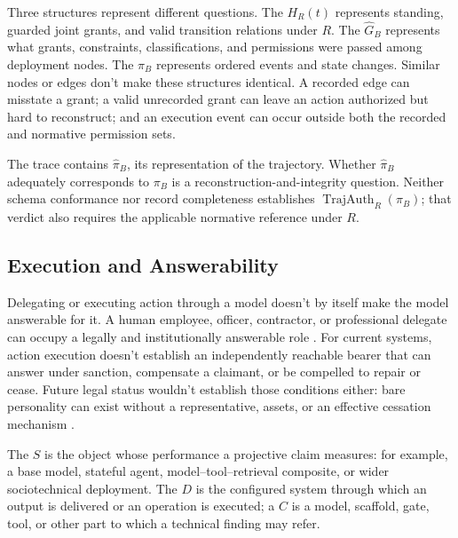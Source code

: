 Three structures represent different questions. The  \(H_R(t)\) represents standing, guarded joint grants, and valid transition relations under \(R\). The  \(\widehat G_B\) represents what grants, constraints, classifications, and permissions were passed among deployment nodes. The  \(\pi_B\) represents ordered events and state changes. Similar nodes or edges don't make these structures identical. A recorded edge can misstate a grant; a valid unrecorded grant can leave an action authorized but hard to reconstruct; and an execution event can occur outside both the recorded and normative permission sets.

The trace contains \(\widehat{\pi}_B\), its representation of the trajectory. Whether \(\widehat{\pi}_B\) adequately corresponds to \(\pi_B\) is a reconstruction-and-integrity question. Neither schema conformance nor record completeness establishes \(\operatorname{TrajAuth}_R(\pi_B)\); that verdict also requires the applicable normative reference under \(R\).

\subsection{Execution and Answerability}

Delegating or executing action through a model doesn't by itself make the model answerable for it. A human employee, officer, contractor, or professional delegate can occupy a legally and institutionally answerable role \parencite{cornellWexPrincipal}. For current systems, action execution doesn't establish an independently reachable bearer that can answer under sanction, compensate a claimant, or be compelled to repair or cease. Future legal status wouldn't establish those conditions either: bare personality can exist without a representative, assets, or an effective cessation mechanism \parencite{rajagopalan2026governingAgenticAI}.

The  \(S\) is the object whose performance a projective claim measures: for example, a base model, stateful agent, model--tool--retrieval composite, or wider sociotechnical deployment. The  \(D\) is the configured system through which an output is delivered or an operation is executed; a  \(C\) is a model, scaffold, gate, tool, or other part to which a technical finding may refer.

